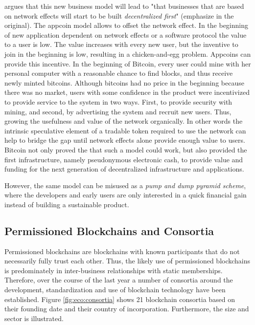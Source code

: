 \cite{Ehrsam2016} argues that this new business model will lead to "that businesses that are based on network effects will start to be built \emph{decentralized first}" (emphasize in the original). The appcoin model allows to offset the network effect. In the beginning of new application dependent on network effects or a software protocol the value to a user is low. The value increases with every new user, but the inventive to join in the beginning is low, resulting in a chicken-and-egg problem. Appcoins can provide this incentive. In the beginning of Bitcoin, every user could mine with her personal computer with a reasonable chance to find blocks, and thus receive newly minted bitcoins. Although bitcoins had no price in the beginning because there was no market, users with some confidence in the product were incentivized to provide service to the system in two ways. First, to provide security with mining, and second, by advertising the system and recruit new users. Thus, growing the usefulness and value of the network organically. In other words the intrinsic speculative element of a tradable token required to use the network can help to bridge the gap until network effects alone provide enough value to users. Bitcoin not only proved the that such a model could work, but also provided the first infrastructure, namely pseudonymous electronic cash, to provide value and funding for the next generation of decentralized infrastructure and applications. 

However, the same model can be misused as a \emph{pump and dump pyramid scheme}, where the developers and early users are only interested in a quick financial gain instead of building a sustainable product. 


\subsection{Permissioned Blockchains and Consortia}
\label{sec:eco:consortia}

Permissioned blockchains are blockchains with known participants that do not necessarily fully trust each other. Thus, the likely use of permissioned blockchains is predominately in inter-business relationships with static memberships. Therefore, over the course of the last year a number of consortia around the development, standardization and use of blockchain technology have been established. Figure \ref{fig:eco:consortia} shows 21 blockchain consortia based on their founding date and their country of incorporation. Furthermore, the size and sector is illustrated. 

